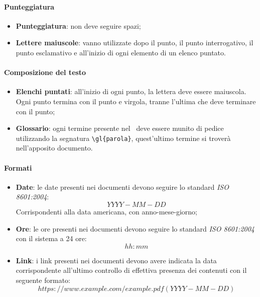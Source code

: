 \documentclass[../NormeDiProgetto.tex]{subfiles}
\begin{document}
\paragraph{Punteggiatura}
\begin{itemize}
  \item \textbf{Punteggiatura}: non deve seguire spazi;
  \item \textbf{Lettere maiuscole}: vanno utilizzate dopo il punto, il punto interrogativo,
  il punto esclamativo e all'inizio di ogni elemento di un elenco puntato.
\end{itemize}

\paragraph{Composizione del testo}
\begin{itemize}
  \item \textbf{Elenchi puntati}: all'inizio di ogni punto, la lettera deve essere maiuscola. Ogni punto termina con il punto e virgola, tranne l'ultima che deve terminare con il punto;
   \item \textbf{Glossario}: ogni termine presente nel \glossario\ deve essere munito di pedice utilizzando la segnatura \verb|\gl{parola}|, quest'ultimo termine si troverà nell'apposito documento.
\end{itemize}

\paragraph{Formati}
\begin{itemize}
   \item \textbf{Date}: le date presenti nei documenti devono seguire lo standard \textit{ISO 8601:2004}:\\
   \begin{equation*}
     YYYY-MM-DD
   \end{equation*}
   Corrispondenti alla data americana, con anno-mese-giorno;
   \item \textbf{Ore}: le ore presenti nei documenti devono seguire lo standard \textit{ISO 8601:2004}
   con il sistema a 24 ore:\\
     \begin{equation*}
     		hh:mm
     \end{equation*}
   \item \textbf{Link}: i link presenti nei documenti devono avere indicata la data corrispondente all'ultimo controllo di effettiva presenza dei contenuti con il seguente formato:\\
   	\begin{equation*}
   		https://www.example.com/example.pdf(YYYY-MM-DD)
   	\end{equation*}
\end{itemize}
\end{document}

